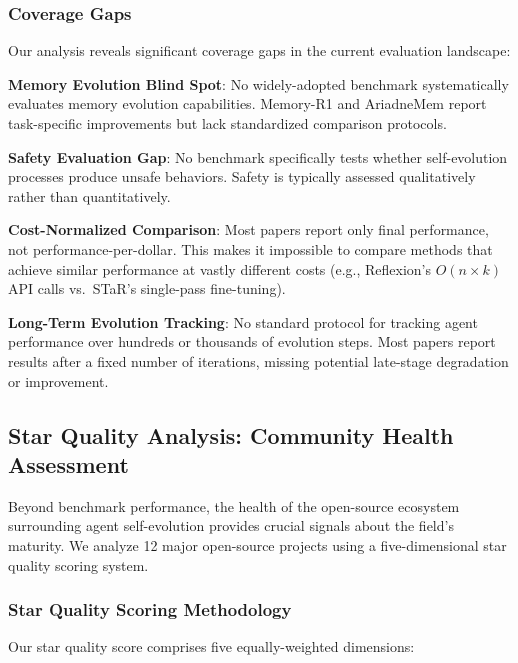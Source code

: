 \subsubsection{Coverage Gaps}

Our analysis reveals significant coverage gaps in the current evaluation landscape:

\textbf{Memory Evolution Blind Spot}: No widely-adopted benchmark systematically evaluates memory evolution capabilities. Memory-R1 and AriadneMem report task-specific improvements but lack standardized comparison protocols.

\textbf{Safety Evaluation Gap}: No benchmark specifically tests whether self-evolution processes produce unsafe behaviors. Safety is typically assessed qualitatively rather than quantitatively.

\textbf{Cost-Normalized Comparison}: Most papers report only final performance, not performance-per-dollar. This makes it impossible to compare methods that achieve similar performance at vastly different costs (e.g., Reflexion's $O(n \times k)$ API calls vs.\ STaR's single-pass fine-tuning).

\textbf{Long-Term Evolution Tracking}: No standard protocol for tracking agent performance over hundreds or thousands of evolution steps. Most papers report results after a fixed number of iterations, missing potential late-stage degradation or improvement.

\subsection{Star Quality Analysis: Community Health Assessment}\label{sec:ch5-star}

Beyond benchmark performance, the health of the open-source ecosystem surrounding agent self-evolution provides crucial signals about the field's maturity. We analyze 12 major open-source projects using a five-dimensional star quality scoring system.

\subsubsection{Star Quality Scoring Methodology}

Our star quality score comprises five equally-weighted dimensions:

